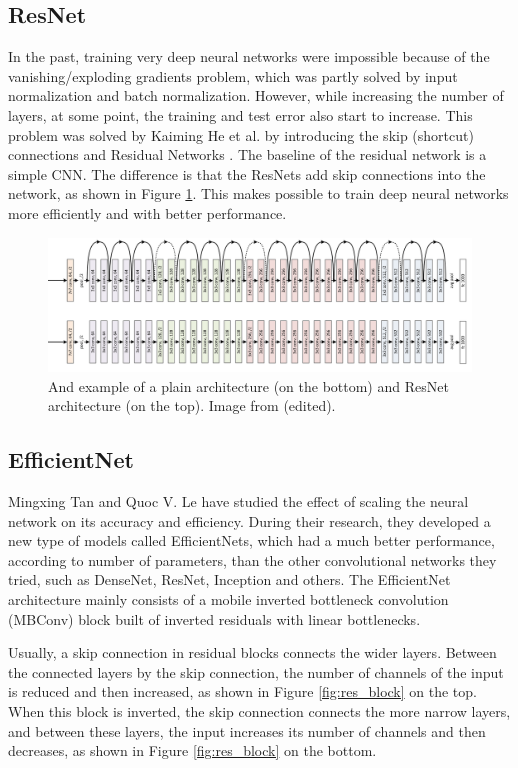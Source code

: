 \documentclass[thesis=B,english]{FITthesis}[2019/12/23]
\begin{document}
\subsection{ResNet}
In the past, training very deep neural networks were impossible because of the vanishing/exploding gradients problem, which was partly solved by input normalization and batch normalization. However, while increasing the number of layers, at some point, the training and test error also start to increase. This problem was solved by Kaiming He et al. by introducing the skip (shortcut) connections and Residual Networks \cite{DBLP:journals/corr/HeZRS15}. The baseline of the residual network is a simple CNN. The difference is that the ResNets add skip connections into the network, as shown in Figure \ref{fig:res_net}. This makes possible to train deep neural networks more efficiently and with better performance.

\begin{figure}[ht]
		\includegraphics[scale=0.32]{images/ResNet.png}
		\centering
		\caption{And example of a plain architecture (on the bottom) and ResNet architecture (on the top). Image from \cite{DBLP:journals/corr/HeZRS15} (edited).}
		\label{fig:res_net}
\end{figure}

\subsection{EfficientNet}
Mingxing Tan and Quoc V. Le \cite{DBLP:journals/corr/abs-1905-11946} have studied the effect of scaling the neural network on its accuracy and efficiency. During their research, they developed a new type of models called EfficientNets, which had a much better performance, according to number of parameters, than the other convolutional networks they tried, such as DenseNet, ResNet, Inception and others. The EfficientNet architecture mainly consists of a mobile inverted bottleneck convolution (MBConv) block built of inverted residuals with linear bottlenecks.

Usually, a skip connection in residual blocks connects the wider layers. Between the connected layers by the skip connection, the number of channels of the input is reduced and then increased, as shown in Figure \ref{fig:res_block} on the top. When this block is inverted, the skip connection connects the more narrow layers, and between these layers, the input increases its number of channels and then decreases, as shown in Figure \ref{fig:res_block} on the bottom.\cite{DBLP:journals/corr/abs-1801-04381}
\end{document}
